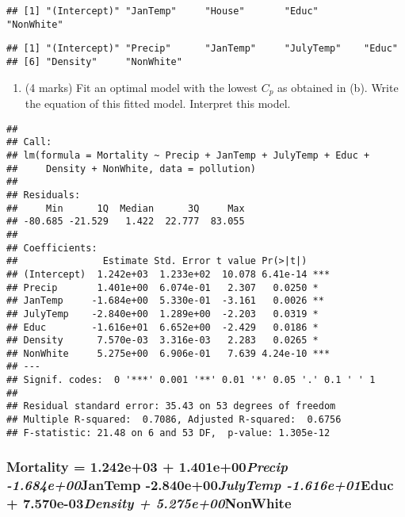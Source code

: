 \documentclass[
]{article}
\providecommand{\tightlist}{%
  \setlength{\itemsep}{0pt}\setlength{\parskip}{0pt}}
\begin{document}
\begin{verbatim}
## [1] "(Intercept)" "JanTemp"     "House"       "Educ"        "NonWhite"
\end{verbatim}

\begin{verbatim}
## [1] "(Intercept)" "Precip"      "JanTemp"     "JulyTemp"    "Educ"       
## [6] "Density"     "NonWhite"
\end{verbatim}

\begin{enumerate}
\def\labelenumi{(\alph{enumi})}
\setcounter{enumi}{2}
\tightlist
\item
  (4 marks) Fit an optimal model with the lowest \(C_p\) as obtained in
  (b). Write the equation of this fitted model. Interpret this model.
\end{enumerate}

\begin{verbatim}
## 
## Call:
## lm(formula = Mortality ~ Precip + JanTemp + JulyTemp + Educ + 
##     Density + NonWhite, data = pollution)
## 
## Residuals:
##     Min      1Q  Median      3Q     Max 
## -80.685 -21.529   1.422  22.777  83.055 
## 
## Coefficients:
##               Estimate Std. Error t value Pr(>|t|)    
## (Intercept)  1.242e+03  1.233e+02  10.078 6.41e-14 ***
## Precip       1.401e+00  6.074e-01   2.307   0.0250 *  
## JanTemp     -1.684e+00  5.330e-01  -3.161   0.0026 ** 
## JulyTemp    -2.840e+00  1.289e+00  -2.203   0.0319 *  
## Educ        -1.616e+01  6.652e+00  -2.429   0.0186 *  
## Density      7.570e-03  3.316e-03   2.283   0.0265 *  
## NonWhite     5.275e+00  6.906e-01   7.639 4.24e-10 ***
## ---
## Signif. codes:  0 '***' 0.001 '**' 0.01 '*' 0.05 '.' 0.1 ' ' 1
## 
## Residual standard error: 35.43 on 53 degrees of freedom
## Multiple R-squared:  0.7086, Adjusted R-squared:  0.6756 
## F-statistic: 21.48 on 6 and 53 DF,  p-value: 1.305e-12
\end{verbatim}

\hypertarget{mortality-1.242e03-1.401e00precip--1.684e00jantemp--2.840e00julytemp--1.616e01educ-7.570e-03density-5.275e00nonwhite}{%
\subsubsection{\texorpdfstring{Mortality = 1.242e+03 +
1.401e+00\emph{Precip -1.684e+00}JanTemp -2.840e+00\emph{JulyTemp
-1.616e+01}Educ + 7.570e-03\emph{Density +
5.275e+00}NonWhite}{Mortality = 1.242e+03 + 1.401e+00Precip -1.684e+00JanTemp -2.840e+00JulyTemp -1.616e+01Educ + 7.570e-03Density + 5.275e+00NonWhite}}\label{mortality-1.242e03-1.401e00precip--1.684e00jantemp--2.840e00julytemp--1.616e01educ-7.570e-03density-5.275e00nonwhite}}
\end{document}
